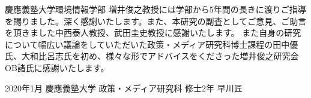 \begin{acknowledgment}

慶應義塾大学環境情報学部 増井俊之教授には学部から5年間の長きに渡りご指導を賜りました。深く感謝いたします。また、本研究の副査としてご意見、ご助言を頂きました中西泰人教授、武田圭史教授に感謝いたします。
また自身の研究について幅広い議論をしていただいた政策・メディア研究科博士課程の田中優氏、大和比呂志氏を初め、様々な形でアドバイスをくださった増井俊之研究会OB諸氏に感謝いたします。
\\
\begin{flushright}
    2020年1月 慶應義塾大学 政策・メディア研究科 修士2年 早川匠
\end{flushright}

\end{acknowledgment}
